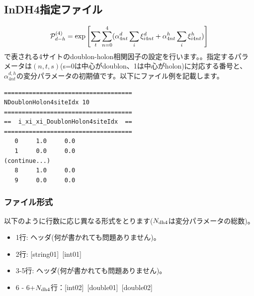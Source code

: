 \newpage
\subsection{InDH4指定ファイル}
\label{Subsec:InDH4}
\begin{equation}
{\cal P}_{d-h}^{(4)}= \exp \left[ \sum_t \sum_{n=0}^4 (\alpha_{4nt}^d \sum_{i}\xi_{i4nt}^d+\alpha_{4nt}^h \sum_{i}\xi_{i4nt}^h)\right]
\end{equation}
で表される4サイトのdoublon-holon相関因子の設定を行います。。指定するパラメータは$(n, t, s)$(s=0は中心がdoublon、1は中心がholon)に対応する番号と、$\alpha_{4nt}^{d,h}$の変分パラメータの初期値です。以下にファイル例を記載します。

\begin{minipage}{12.5cm}
\begin{screen}
\begin{verbatim}
====================================
NDoublonHolon4siteIdx 10
====================================
==  i_xi_xi_DoublonHolon4siteIdx  ==
====================================
   0     1.0     0.0
   1     0.0     0.0 
(continue...)
   8     1.0     0.0 
   9     0.0     0.0 
\end{verbatim}
\end{screen}
\end{minipage}

\subsubsection{ファイル形式}
以下のように行数に応じ異なる形式をとります($N_{\rm dh4}$は変分パラメータの総数)。
 \begin{itemize}
   \item  1行:  ヘッダ(何が書かれても問題ありません)。
   \item  2行:   [string01]~[int01]
   \item  3-5行:  ヘッダ(何が書かれても問題ありません)。
   \item  6 - 6+$N_{\rm dh4}$行：[int02]~[double01]~[double02]
  \end{itemize}
